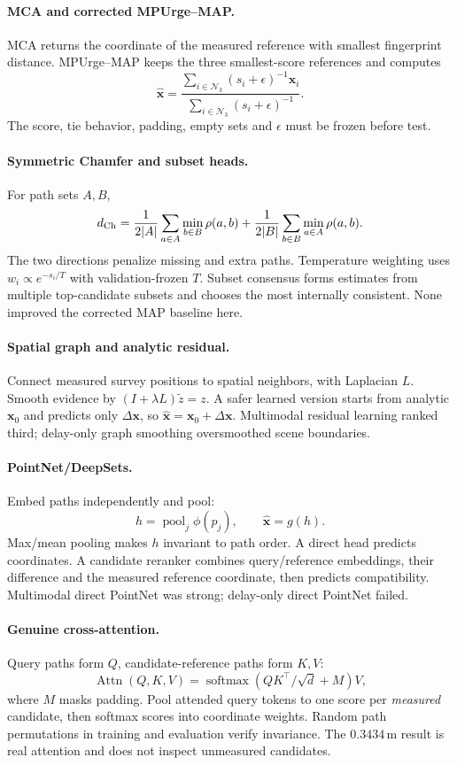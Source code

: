 \documentclass[10pt,a4paper]{article}
\newcommand{\m}{\,\mathrm{m}}
\begin{document}
\paragraph{MCA and corrected MPUrge--MAP.} MCA returns the coordinate of the measured reference with smallest fingerprint distance. MPUrge--MAP keeps the three smallest-score references and computes
\[
 \widehat{\mathbf x}=\frac{\sum_{i\in\mathcal N_3}(s_i+\epsilon)^{-1}\mathbf x_i}
 {\sum_{i\in\mathcal N_3}(s_i+\epsilon)^{-1}}.
\]
The score, tie behavior, padding, empty sets and $\epsilon$ must be frozen before test.

\paragraph{Symmetric Chamfer and subset heads.} For path sets $A,B$,
\[
d_{\rm Ch}=\frac1{2|A|}\sum_{a\in A}\min_{b\in B}\rho(a,b)+
\frac1{2|B|}\sum_{b\in B}\min_{a\in A}\rho(a,b).
\]
The two directions penalize missing and extra paths. Temperature weighting uses $w_i\propto e^{-s_i/T}$ with validation-frozen $T$. Subset consensus forms estimates from multiple top-candidate subsets and chooses the most internally consistent. None improved the corrected MAP baseline here.

\paragraph{Spatial graph and analytic residual.} Connect measured survey positions to spatial neighbors, with Laplacian $L$. Smooth evidence by $(I+\lambda L)\widetilde z=z$. A safer learned version starts from analytic $\mathbf x_0$ and predicts only $\Delta\mathbf x$, so $\widehat{\mathbf x}=\mathbf x_0+\Delta\mathbf x$. Multimodal residual learning ranked third; delay-only graph smoothing oversmoothed scene boundaries.

\paragraph{PointNet/DeepSets.} Embed paths independently and pool:
\[
h=\operatorname{pool}_{j}\phi(p_j),\qquad \widehat{\mathbf x}=g(h).
\]
Max/mean pooling makes $h$ invariant to path order. A direct head predicts coordinates. A candidate reranker combines query/reference embeddings, their difference and the measured reference coordinate, then predicts compatibility. Multimodal direct PointNet was strong; delay-only direct PointNet failed.

\paragraph{Genuine cross-attention.} Query paths form $Q$, candidate-reference paths form $K,V$:
\[
\operatorname{Attn}(Q,K,V)=\operatorname{softmax}\left(QK^\top/\sqrt d+M\right)V,
\]
where $M$ masks padding. Pool attended query tokens to one score per \emph{measured} candidate, then softmax scores into coordinate weights. Random path permutations in training and evaluation verify invariance. The $0.3434\m$ result is real attention and does not inspect unmeasured candidates.
\end{document}
